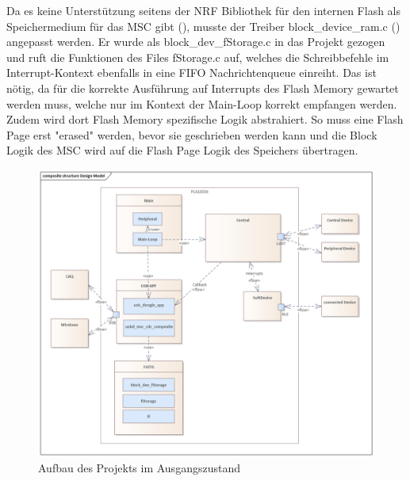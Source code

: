 Da es keine Unterstützung seitens der NRF Bibliothek für den internen Flash als Speichermedium für das \ac{MSC} gibt (\cite{NRF_MSC_Forum}), musste der Treiber block\_device\_ram.c (\cite{NRF_Block_device_RAM}) angepasst werden. Er wurde als block\_dev\_fStorage.c in das Projekt gezogen und ruft die Funktionen des Files fStorage.c auf, welches die Schreibbefehle im Interrupt-Kontext ebenfalls in eine \ac{FIFO} Nachrichtenqueue einreiht. Das ist nötig, da für die korrekte Ausführung auf Interrupts des Flash Memory gewartet werden muss, welche nur im Kontext der Main-Loop korrekt empfangen werden. Zudem wird dort Flash Memory spezifische Logik abstrahiert. So muss eine Flash Page erst "erased" werden, bevor sie geschrieben werden kann und die Block Logik des \ac{MSC} wird auf die Flash Page Logik des Speichers übertragen.

\begin{figure}[H] 
	\centering
	\includegraphics[width=\textwidth]{figures/Design_Model.png}
	\caption{Aufbau des Projekts im Ausgangszustand}
\end{figure}


